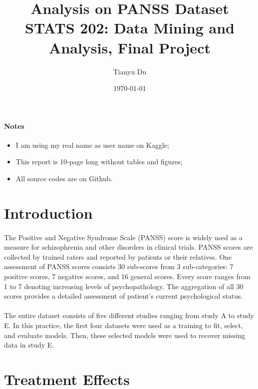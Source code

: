 \documentclass[11pt]{article}
\title{Analysis on PANSS Dataset\\ \small STATS 202: Data Mining and Analysis, Final Project}
\author{Tianyu Du}
\date{\today}
\begin{document}
	\maketitle
	\paragraph{Notes}
	\begin{itemize}
		\item I am using my real name as user name on Kaggle;
		\item This report is 10-page long without tables and figures;
		\item All source codes are on Github.
	\end{itemize}
	\tableofcontents

	\section{Introduction}
	\paragraph{}The Positive and Negative Syndrome Scale (PANSS) score is widely used as a measure for schizophrenia and other disorders in clinical trials. PANSS scores are collected by trained raters and reported by patients or their relatives. One assessment of PANSS scores consists 30 sub-scores from 3 sub-categories: 7 positive scores, 7 negative scores, and 16 general scores. Every score ranges from 1 to 7 denoting increasing levels of psychopathology. The aggregation of all 30 scores provides a detailed assessment of patient's current psychological status.
	
	\paragraph{}The entire dataset consists of five different studies ranging from study A to study E. In this practice, the first four datasets were used as a training to fit, select, and evaluate models. Then, these selected models were used to recover missing data in study E.
	
	\section{Treatment Effects}
\end{document}
